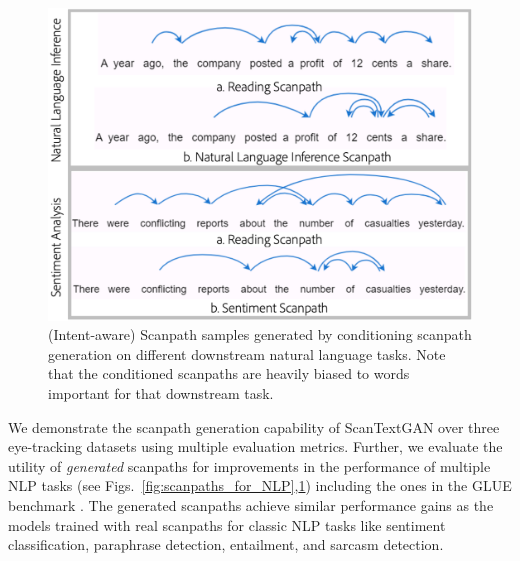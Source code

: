 \begin{figure}[!t]
    \centering
    \includegraphics[width=0.7\columnwidth]{images/intent-scantextgan-scanpaths-3.pdf}
    \caption{\small (Intent-aware) Scanpath samples generated by conditioning scanpath generation on different downstream natural language tasks. Note that the conditioned scanpaths are heavily biased to words important for that downstream task.}
    \label{fig:intent-scanpaths-example} 
\end{figure}


We demonstrate the scanpath generation capability of ScanTextGAN over three eye-tracking datasets using multiple evaluation metrics. Further, we evaluate the utility of \textit{generated} scanpaths for improvements in the performance of multiple NLP tasks (see Figs.~\ref{fig:scanpaths_for_NLP},\ref{fig:intent-scanpaths-example}) including the ones in the GLUE benchmark \cite{wang-etal-2018-glue}. The generated scanpaths achieve similar performance gains as the models trained with real scanpaths for classic NLP tasks like sentiment classification, paraphrase detection, entailment, and sarcasm detection. 

